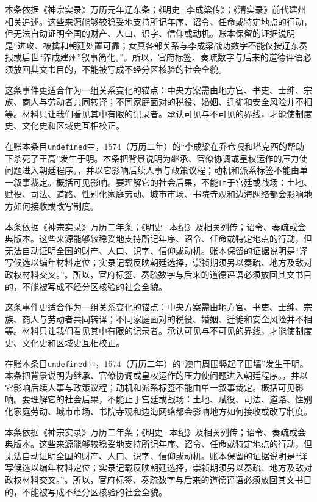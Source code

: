 本条依据《神宗实录》万历元年辽东条；《明史·李成梁传》；《清实录》前代建州相关追述。这些来源能够较稳妥地支持所记年序、诏令、任命或特定地点的行动，但无法自动证明全国的财产、人口、识字、信仰或动机。账本保留的证据说明是“进攻、被擒和朝廷处置可靠；女真各部关系与李成梁战功数字不能仅按辽东奏报或后世“养成建州”叙事简化。”。所以，官府标签、奏疏数字与后来的道德评语必须放回其文书目的，不能被写成不经分区核验的社会全貌。

这条事件更适合作为一组关系变化的锚点：中央方案需由地方官、书吏、士绅、宗族、商人与劳动者共同转译；不同家庭面对的税役、婚姻、迁徙和安全风险并不相等。材料只让我们看见其中有限的记录者。承认可见与不可见的界线，才能使制度史、文化史和区域史互相校正。

在账本条目\texttt{undefined}中，1574（万历二年）的“李成梁在乔仓嘎和塔克西的帮助下杀死了王高”发生于明。本条把背景说明为继承、官僚协调或皇权运作的压力使问题进入朝廷程序。，并以它影响后续人事与政策议程；动机和派系标签不能由单一叙事裁定。概括可见影响。要理解它的社会后果，不能止于宫廷或战场：土地、赋役、司法、道路、性别化家庭劳动、城市市场、书院寺观和边海网络都会影响地方如何接收或改写制度。

本条依据《神宗实录》万历二年条；《明史·本纪》及相关列传；诏令、奏疏或会典版本。这些来源能够较稳妥地支持所记年序、诏令、任命或特定地点的行动，但无法自动证明全国的财产、人口、识字、信仰或动机。账本保留的证据说明是“译写候选以编年材料定位；实录记载反映朝廷选择，崇祯期须另以奏疏、地方及敌对政权材料交叉。”。所以，官府标签、奏疏数字与后来的道德评语必须放回其文书目的，不能被写成不经分区核验的社会全貌。

这条事件更适合作为一组关系变化的锚点：中央方案需由地方官、书吏、士绅、宗族、商人与劳动者共同转译；不同家庭面对的税役、婚姻、迁徙和安全风险并不相等。材料只让我们看见其中有限的记录者。承认可见与不可见的界线，才能使制度史、文化史和区域史互相校正。

在账本条目\texttt{undefined}中，1574（万历二年）的“澳门周围竖起了围墙”发生于明。本条把背景说明为继承、官僚协调或皇权运作的压力使问题进入朝廷程序。，并以它影响后续人事与政策议程；动机和派系标签不能由单一叙事裁定。概括可见影响。要理解它的社会后果，不能止于宫廷或战场：土地、赋役、司法、道路、性别化家庭劳动、城市市场、书院寺观和边海网络都会影响地方如何接收或改写制度。

本条依据《神宗实录》万历二年条；《明史·本纪》及相关列传；诏令、奏疏或会典版本。这些来源能够较稳妥地支持所记年序、诏令、任命或特定地点的行动，但无法自动证明全国的财产、人口、识字、信仰或动机。账本保留的证据说明是“译写候选以编年材料定位；实录记载反映朝廷选择，崇祯期须另以奏疏、地方及敌对政权材料交叉。”。所以，官府标签、奏疏数字与后来的道德评语必须放回其文书目的，不能被写成不经分区核验的社会全貌。

